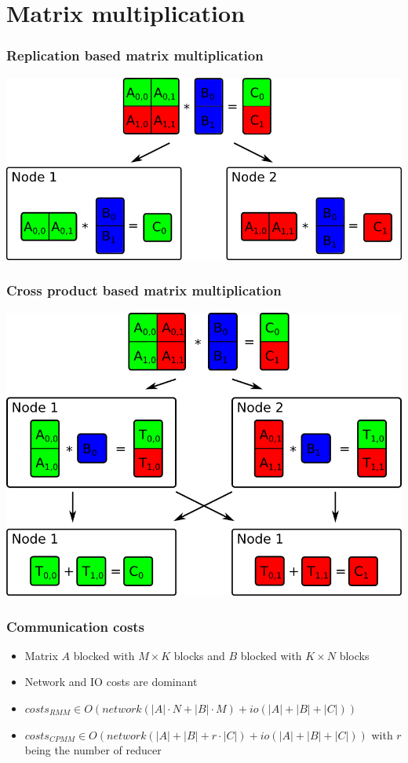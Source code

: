 \section{Matrix multiplication}

\begin{frame}
	\frametitle{Replication based matrix multiplication}
	\begin{center}
	\includegraphics[width=\textwidth]{images/rmm.png}
	\end{center}
\end{frame}	

\begin{frame}
	\frametitle{Cross product based matrix multiplication}
	\begin{center}
	\includegraphics[height=0.8\textheight]{images/cpmm.png}
	\end{center}
\end{frame}

\begin{frame}
	\frametitle{Communication costs}
	\begin{itemize}
		\item Matrix $A$ blocked with $M \times K$ blocks and $B$ blocked with $K \times N$ blocks
		\item Network and IO costs are dominant
		\item $costs_{RMM} \in O\left(network(|A|\cdot N + |B|\cdot M) + io(|A|+|B|+|C|)\right)$
		\item $costs_{CPMM} \in O\left(network(|A|+|B|+r\cdot|C|) + io(|A|+|B|+|C|) \right)$ with $r$ being the number of reducer
	\end{itemize}
\end{frame}

